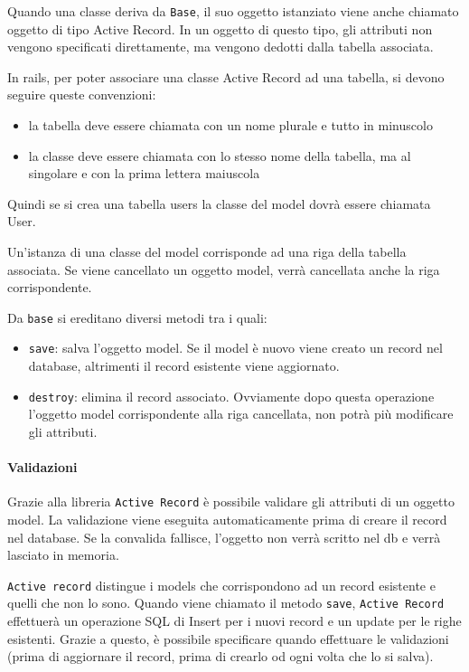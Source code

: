 \documentclass[11pt,a4paper]{article}
\begin{document}
Quando una classe deriva da \verb|Base|, il suo oggetto istanziato viene anche chiamato oggetto di tipo Active Record.
In un oggetto di questo tipo, gli attributi non vengono specificati direttamente, ma vengono dedotti dalla tabella associata.


In rails, per poter associare una classe Active Record ad una tabella, si devono seguire queste convenzioni:
\begin{itemize}
 \item la tabella deve essere chiamata con un nome plurale e tutto in minuscolo
 \item la classe deve essere chiamata con lo stesso nome della tabella, ma al singolare e con la prima lettera maiuscola
\end{itemize}
Quindi se si crea una tabella users la classe del model dovrà essere chiamata User.


Un'istanza di una classe del model corrisponde ad una riga della tabella associata.
Se viene cancellato un oggetto model, verrà cancellata anche la riga corrispondente.


Da \verb|base| si ereditano diversi metodi tra i quali:
\begin{itemize}
 \item \verb|save|: salva l'oggetto model. Se il model è nuovo viene creato un record nel database, altrimenti il record esistente viene aggiornato.
 \item \verb|destroy|: elimina il record associato. Ovviamente dopo questa operazione l'oggetto model corrispondente alla riga cancellata, non potrà più modificare gli attributi.
\end{itemize}
\paragraph{Validazioni}
Grazie alla libreria \verb|Active Record| è possibile validare gli attributi di un oggetto model. La validazione viene eseguita automaticamente prima di creare il record nel database. Se la convalida fallisce, l'oggetto non verrà scritto nel db e verrà lasciato in memoria.


\verb|Active record| distingue i models che corrispondono ad un record esistente e quelli che non lo sono. Quando viene chiamato il metodo \verb|save|, \verb|Active Record| effettuerà un operazione SQL di Insert per i nuovi record e un update per le righe esistenti. Grazie a questo, è possibile specificare quando effettuare le validazioni (prima di aggiornare il record, prima di crearlo od ogni volta che lo si salva).
\end{document}
